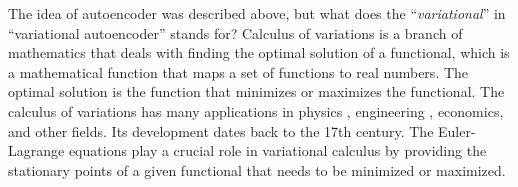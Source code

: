 

The idea of autoencoder was described above, but what does the ``\textit{variational}'' in ``variational autoencoder'' stands for? 
Calculus of variations is a branch of mathematics that deals with finding the optimal solution of a functional, which is a mathematical 
function that maps a set of functions to real numbers. The optimal solution is the function that minimizes or maximizes the functional. 
The calculus of variations has many applications in physics \cite{lagrangian-mechanics-1998}, engineering \cite{optimal-control-2004}, economics, and other fields.
Its development dates back to the 17th century. The Euler-Lagrange equations \cite{intro-variational-calc-2003} play a crucial role in variational calculus by providing the stationary points of a given 
functional that needs to be minimized or maximized.

